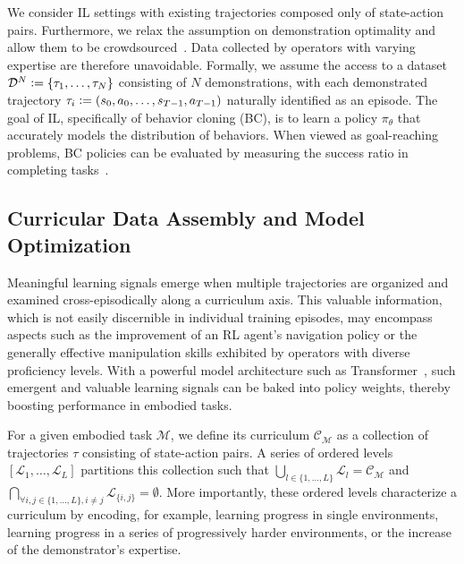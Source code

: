 We consider IL settings with existing trajectories composed only of state-action pairs.
Furthermore, we relax the assumption on demonstration optimality and allow them to be crowdsourced~\citep{brown2019extrapolating,chen2020learning,cao2021learning}.
Data collected by operators with varying expertise are therefore unavoidable. 
Formally, we assume the access to a dataset $\mathcal{D}^N \vcentcolon= \{\tau_1, \ldots, \tau_{N}\}$ consisting of $N$ demonstrations, with each demonstrated trajectory $\tau_i \vcentcolon= (s_0, a_0, \ldots, s_{T - 1}, a_{T - 1})$ naturally identified as an episode.
The goal of IL, specifically of behavior cloning (BC), is to learn a policy $\pi_\theta$ that accurately models the distribution of behaviors.
When viewed as goal-reaching problems, BC policies can be evaluated by measuring the success ratio in completing tasks~\citep{ghosh2019learning}.

\subsection{Curricular Data Assembly and Model Optimization}
Meaningful learning signals emerge when multiple trajectories are organized and examined cross-episodically along a curriculum axis.
This valuable information, which is not easily discernible in individual training episodes, may encompass aspects such as the improvement of an RL agent's navigation policy or the generally effective manipulation skills exhibited by operators with diverse proficiency levels.
With a powerful model architecture such as Transformer~\cite {vaswani2017attention,dai2019transformerxl}, such emergent and valuable learning signals can be baked into policy weights, thereby boosting performance in embodied tasks.

For a given embodied task $\mathcal{M}$, we define its curriculum $\mathcal{C}_\mathcal{M}$ as a collection of trajectories $\tau$ consisting of state-action pairs.
A series of ordered levels $[\mathcal{L}_1, \ldots, \mathcal{L}_L]$ partitions this collection such that $\bigcup_{l \in \{1, \ldots, L\}} \mathcal{L}_{l} = \mathcal{C}_\mathcal{M}$ and $\bigcap_{\forall i, j \in \{1, \ldots, L\}, i \neq j} \mathcal{L}_{\{i, j\}} = \emptyset$.
More importantly, these ordered levels characterize a curriculum by encoding, for example, learning progress in single environments, learning progress in a series of progressively harder environments, or the increase of the demonstrator's expertise.

